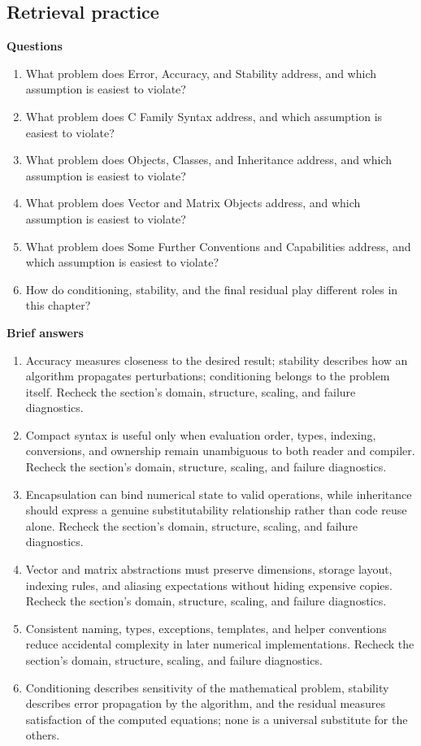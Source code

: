 \documentclass[10pt,letterpaper]{article}
\begin{document}
\subsection*{Retrieval practice}
\textbf{Questions}
\begin{enumerate}
\item What problem does Error, Accuracy, and Stability address, and which assumption is easiest to violate?
\item What problem does C Family Syntax address, and which assumption is easiest to violate?
\item What problem does Objects, Classes, and Inheritance address, and which assumption is easiest to violate?
\item What problem does Vector and Matrix Objects address, and which assumption is easiest to violate?
\item What problem does Some Further Conventions and Capabilities address, and which assumption is easiest to violate?
\item How do conditioning, stability, and the final residual play different roles in this chapter?
\end{enumerate}

\textbf{Brief answers}
\begin{enumerate}
\item Accuracy measures closeness to the desired result; stability describes how an algorithm propagates perturbations; conditioning belongs to the problem itself. Recheck the section's domain, structure, scaling, and failure diagnostics.
\item Compact syntax is useful only when evaluation order, types, indexing, conversions, and ownership remain unambiguous to both reader and compiler. Recheck the section's domain, structure, scaling, and failure diagnostics.
\item Encapsulation can bind numerical state to valid operations, while inheritance should express a genuine substitutability relationship rather than code reuse alone. Recheck the section's domain, structure, scaling, and failure diagnostics.
\item Vector and matrix abstractions must preserve dimensions, storage layout, indexing rules, and aliasing expectations without hiding expensive copies. Recheck the section's domain, structure, scaling, and failure diagnostics.
\item Consistent naming, types, exceptions, templates, and helper conventions reduce accidental complexity in later numerical implementations. Recheck the section's domain, structure, scaling, and failure diagnostics.
\item Conditioning describes sensitivity of the mathematical problem, stability describes error propagation by the algorithm, and the residual measures satisfaction of the computed equations; none is a universal substitute for the others.
\end{enumerate}
\end{document}
